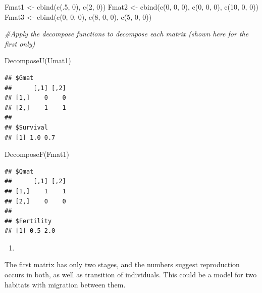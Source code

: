 \documentclass[
]{book}
\newenvironment{Shaded}{\begin{snugshade}}{\end{snugshade}}
\newcommand{\CommentTok}[1]{\textcolor[rgb]{0.56,0.35,0.01}{\textit{#1}}}
\newcommand{\DecValTok}[1]{\textcolor[rgb]{0.00,0.00,0.81}{#1}}
\newcommand{\FunctionTok}[1]{\textcolor[rgb]{0.00,0.00,0.00}{#1}}
\newcommand{\NormalTok}[1]{#1}
\newcommand{\OtherTok}[1]{\textcolor[rgb]{0.56,0.35,0.01}{#1}}
\providecommand{\tightlist}{%
  \setlength{\itemsep}{0pt}\setlength{\parskip}{0pt}}
\begin{document}
\begin{Shaded}
\begin{Highlighting}[]
\NormalTok{Fmat1 }\OtherTok{\textless{}{-}} \FunctionTok{cbind}\NormalTok{(}\FunctionTok{c}\NormalTok{(.}\DecValTok{5}\NormalTok{, }\DecValTok{0}\NormalTok{), }\FunctionTok{c}\NormalTok{(}\DecValTok{2}\NormalTok{, }\DecValTok{0}\NormalTok{))}
\NormalTok{Fmat2 }\OtherTok{\textless{}{-}} \FunctionTok{cbind}\NormalTok{(}\FunctionTok{c}\NormalTok{(}\DecValTok{0}\NormalTok{, }\DecValTok{0}\NormalTok{, }\DecValTok{0}\NormalTok{), }\FunctionTok{c}\NormalTok{(}\DecValTok{0}\NormalTok{, }\DecValTok{0}\NormalTok{, }\DecValTok{0}\NormalTok{), }\FunctionTok{c}\NormalTok{(}\DecValTok{10}\NormalTok{, }\DecValTok{0}\NormalTok{, }\DecValTok{0}\NormalTok{))}
\NormalTok{Fmat3 }\OtherTok{\textless{}{-}} \FunctionTok{cbind}\NormalTok{(}\FunctionTok{c}\NormalTok{(}\DecValTok{0}\NormalTok{, }\DecValTok{0}\NormalTok{, }\DecValTok{0}\NormalTok{), }\FunctionTok{c}\NormalTok{(}\DecValTok{8}\NormalTok{, }\DecValTok{0}\NormalTok{, }\DecValTok{0}\NormalTok{), }\FunctionTok{c}\NormalTok{(}\DecValTok{5}\NormalTok{, }\DecValTok{0}\NormalTok{, }\DecValTok{0}\NormalTok{))}

\CommentTok{\#Apply the decompose functions to decompose each matrix (shown here for the first only)}

\FunctionTok{DecomposeU}\NormalTok{(Umat1)}
\end{Highlighting}
\end{Shaded}

\begin{verbatim}
## $Gmat
##      [,1] [,2]
## [1,]    0    0
## [2,]    1    1
## 
## $Survival
## [1] 1.0 0.7
\end{verbatim}

\begin{Shaded}
\begin{Highlighting}[]
\FunctionTok{DecomposeF}\NormalTok{(Fmat1)}
\end{Highlighting}
\end{Shaded}

\begin{verbatim}
## $Qmat
##      [,1] [,2]
## [1,]    1    1
## [2,]    0    0
## 
## $Fertility
## [1] 0.5 2.0
\end{verbatim}

\begin{enumerate}
\def\labelenumi{\arabic{enumi}.}
\setcounter{enumi}{2}
\tightlist
\item
\end{enumerate}

The first matrix has only two stages, and the numbers suggest reproduction occurs in both, as well as transition of individuals. This could be a model for two habitats with migration between them.
\end{document}
